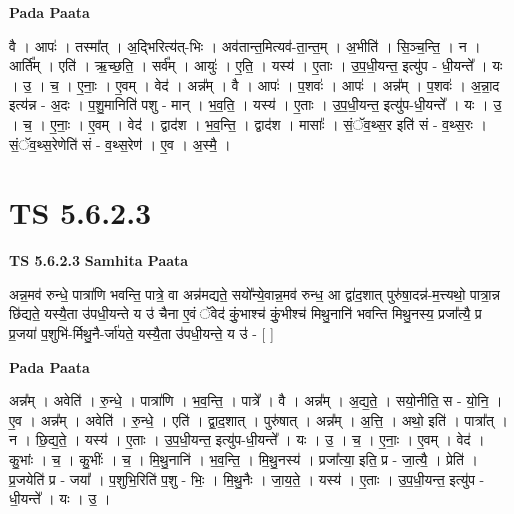 \documentclass[17pt]{extarticle}
\begin{document}
\textbf{Pada Paata} \newline

वै । आपः॑ । तस्मा᳚त् । अ॒द्भिरित्य॑त्-भिः । अव॑तान्त॒मित्यव॑-ता॒न्त॒म् । अ॒भीति॑ । सि॒ञ्च॒न्ति॒ । न । आर्ति᳚म् । एति॑ । ऋ॒च्छ॒ति॒ । सर्व᳚म् । आयुः॑ । ए॒ति॒ । यस्य॑ । ए॒ताः । उ॒प॒धी॒यन्त॒ इत्यु॑प - धी॒यन्ते᳚ । यः । उ॒ । च॒ । ए॒नाः॒ । ए॒वम् । वेद॑ । अन्न᳚म् । वै । आपः॑ । प॒शवः॑ । आपः॑ । अन्न᳚म् । प॒शवः॑ । अ॒न्ना॒द इत्य॑न्न - अ॒दः । प॒शु॒मानिति॑ पशु - मान् । भ॒व॒ति॒ । यस्य॑ । ए॒ताः । उ॒प॒धी॒यन्त॒ इत्यु॑प-धी॒यन्ते᳚ । यः । उ॒ । च॒ । ए॒नाः॒ । ए॒वम् । वेद॑ । द्वाद॑श । भ॒व॒न्ति॒ । द्वाद॑श । मासाः᳚ । सं॒ॅव॒थ्स॒र इति॑ सं - व॒थ्स॒रः । सं॒ॅव॒थ्स॒रेणेति॑ सं - व॒थ्स॒रेण॑ । ए॒व । अ॒स्मै॒ ।  \newline





\section{ TS 5.6.2.3 }

\textbf{TS 5.6.2.3 } \newline
\textbf{Samhita Paata} \newline

अन्न॒मव॑ रुन्धे॒ पात्रा॑णि भवन्ति॒ पात्रे॒ वा अन्न॑मद्यते॒ सयो᳚न्ये॒वान्न॒मव॑ रुन्ध॒ आ द्वा॑द॒शात् पुरु॑षा॒दन्न॑-म॒त्त्यथो॒ पात्रा॒न्न छि॑द्यते॒ यस्यै॒ता उ॑पधी॒यन्ते य उ॑ चैना ए॒वं ॅवेद॑ कुं॒भाश्च॑ कुं॒भीश्च॑ मिथु॒नानि॑ भवन्ति मिथु॒नस्य॒ प्रजा᳚त्यै॒ प्र प्र॒जया॑ प॒शुभि॑-र्मिथु॒नै-र्जा॑यते॒ यस्यै॒ता उ॑पधी॒यन्ते॒ य उ॑ - [  ] \newline

\textbf{Pada Paata} \newline

अन्न᳚म् । अवेति॑ । रु॒न्धे॒ । पात्रा॑णि । भ॒व॒न्ति॒ । पात्रे᳚ । वै । अन्न᳚म् । अ॒द्य॒ते॒ । सयो॒नीति॒ स - यो॒नि॒ । ए॒व । अन्न᳚म् । अवेति॑ । रु॒न्धे॒ । एति॑ । द्वा॒द॒शात् । पुरु॑षात् । अन्न᳚म् । अ॒त्ति॒ । अथो॒ इति॑ । पात्रा᳚त् । न । छि॒द्य॒ते॒ । यस्य॑ । ए॒ताः । उ॒प॒धी॒यन्त॒ इत्यु॑प-धी॒यन्ते᳚ । यः । उ॒ । च॒ । ए॒नाः॒ । ए॒वम् । वेद॑ । कु॒भांः । च॒ । कु॒भींः । च॒ । मि॒थु॒नानि॑ । भ॒व॒न्ति॒ । मि॒थु॒नस्य॑ । प्रजा᳚त्या॒ इति॒ प्र - जा॒त्यै॒ । प्रेति॑ । प्र॒जयेति॑ प्र - जया᳚ । प॒शुभि॒रिति॑ प॒शु - भिः॒ । मि॒थु॒नैः । जा॒य॒ते॒ । यस्य॑ । ए॒ताः । उ॒प॒धी॒यन्त॒ इत्यु॑प - धी॒यन्ते᳚ । यः । उ॒ ।  \newline




\end{document}
